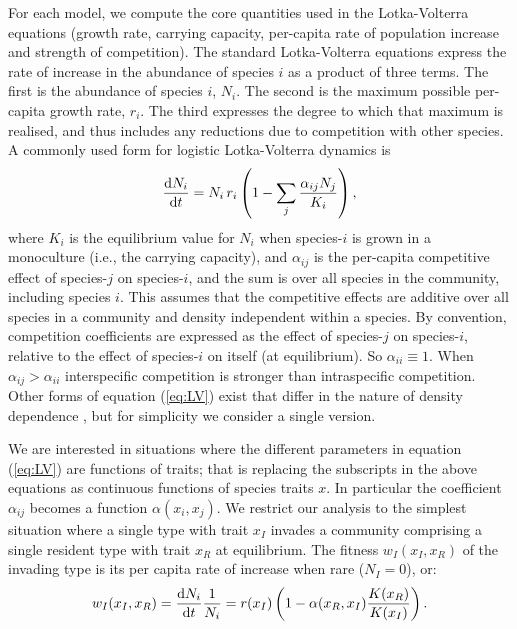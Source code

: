 \documentclass[a4paper,11pt]{article}
\begin{document}
For each model, we compute the core quantities used in the
Lotka-Volterra equations (growth rate, carrying capacity, per-capita
rate of population increase and strength of competition).  The
standard Lotka-Volterra equations express the rate of increase in the
abundance of species $i$ as a product of three terms.
%
The first is the abundance of species $i$, $N_i$.
%
The second is the maximum possible per-capita growth rate, $r_i$. The
third expresses the degree to which that maximum is realised, and
thus includes any reductions due to competition with other species. A
commonly used form for logistic Lotka-Volterra dynamics is
%
\begin{equation}
\label{eq:LV}
\frac{\mathrm{d} N_i}{\mathrm{d} t} =
N_i\, r_i \left(1 - \sum_j \frac{\alpha_{ij} N_j}{K_i}\right),
\end{equation}
%
where $K_i$ is the equilibrium value for $N_i$ when species-$i$ is
grown in a monoculture (i.e., the carrying capacity), and
$\alpha_{ij}$ is the per-capita competitive effect of species-$j$ on
species-$i$, and the sum is over all species in the community,
including species $i$.  This assumes that the competitive effects are
additive over all species in a community and density independent
within a species.
%
By convention, competition coefficients are expressed as the effect of
species-$j$ on species-$i$, relative to the effect of species-$i$ on
itself (at equilibrium).  So $\alpha_{ii} \equiv 1$. When
$\alpha_{ij} > \alpha_{ii}$ interspecific competition is stronger than
intraspecific competition.
%
Other forms of equation (\ref{eq:LV}) exist that differ in the nature
of density dependence \citep[e.g.][]{Leimar-2013}, but for simplicity
we consider a single version.

We are interested in situations where the different parameters in
equation (\ref{eq:LV}) are functions of traits; that is replacing the
subscripts in the above equations as continuous functions of species
traits $x$.  In particular the coefficient $\alpha_{ij}$ becomes a
function $\alpha(x_i, x_j)$.
%
We restrict our analysis to the simplest situation where a single
type with trait $x_I$ invades a community comprising a single
resident type with trait $x_R$ at equilibrium.  The fitness $w_I(x_I,
x_R)$ of the invading type is its per capita rate of increase when
rare ($N_I = 0$), or:
%
\begin{equation}
  \label{eq:LVi}
   w_I(x_I, x_R) = \frac{\mathrm{d} N_i}{\mathrm{d} t} \frac{1}{N_i} =
    r(x_I)\left(1 - \alpha(x_R, x_I) \frac{K(x_R)}{K(x_I)}\right).
\end{equation}
\end{document}
